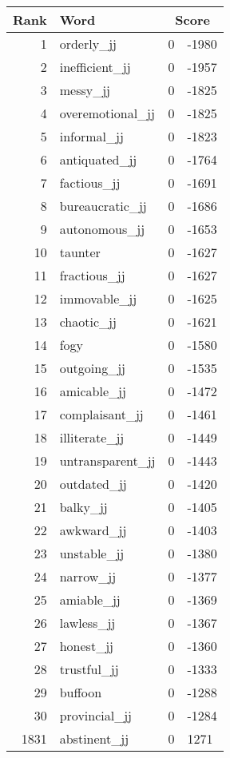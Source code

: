 \begin{longtable}[!htbp]{| rlr@{.}l |}
    \hline
    \textbf{Rank} & \textbf{Word} & \multicolumn{2}{c|}{\textbf{Score}} \\
    \hline
    \endhead
    1 & orderly\_jj & 0 & -1980 \\
    2 & inefficient\_jj & 0 & -1957 \\
    3 & messy\_jj & 0 & -1825 \\
    4 & overemotional\_jj & 0 & -1825 \\
    5 & informal\_jj & 0 & -1823 \\
    6 & antiquated\_jj & 0 & -1764 \\
    7 & factious\_jj & 0 & -1691 \\
    8 & bureaucratic\_jj & 0 & -1686 \\
    9 & autonomous\_jj & 0 & -1653 \\
    10 & taunter & 0 & -1627 \\
    11 & fractious\_jj & 0 & -1627 \\
    12 & immovable\_jj & 0 & -1625 \\
    13 & chaotic\_jj & 0 & -1621 \\
    14 & fogy & 0 & -1580 \\
    15 & outgoing\_jj & 0 & -1535 \\
    16 & amicable\_jj & 0 & -1472 \\
    17 & complaisant\_jj & 0 & -1461 \\
    18 & illiterate\_jj & 0 & -1449 \\
    19 & untransparent\_jj & 0 & -1443 \\
    20 & outdated\_jj & 0 & -1420 \\
    21 & balky\_jj & 0 & -1405 \\
    22 & awkward\_jj & 0 & -1403 \\
    23 & unstable\_jj & 0 & -1380 \\
    24 & narrow\_jj & 0 & -1377 \\
    25 & amiable\_jj & 0 & -1369 \\
    26 & lawless\_jj & 0 & -1367 \\
    27 & honest\_jj & 0 & -1360 \\
    28 & trustful\_jj & 0 & -1333 \\
    29 & buffoon & 0 & -1288 \\
    30 & provincial\_jj & 0 & -1284 \\
    1831 & abstinent\_jj & 0 & 1271 \\

\end{longtable}
